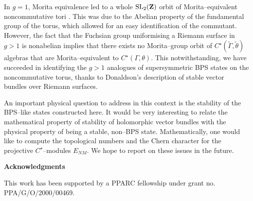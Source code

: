 \documentclass[a4paper,a4paper]{article}
\begin{document}
In $g=1$, Morita equivalence led to a whole ${\rm SL}_2({\bf Z})$ orbit of  
Morita--equivalent noncommutative tori \cite{SCHWARZ}. This was due to the 
Abelian property of the fundamental group of the torus, which allowed for 
an easy identification of the commutant. However, the fact that the Fuchsian 
group uniformising a Riemann surface in $g>1$ is nonabelian implies that 
there exists no Morita--group orbit of $C^{\star}(\tilde\Gamma, \tilde\theta)$ 
algebras that are Morita--equivalent to $C^{\star}(\Gamma,\theta)$. 
This notwithstanding, we have succeeded in identifying the $g>1$ analogues 
of supersymmetric BPS states on the noncommutative torus, 
thanks to Donaldson's description of stable vector bundles 
over Riemann surfaces.

An important physical question to address in this context is the 
stability of the BPS--like states constructed here. It would be very 
interesting to relate the mathematical property of stability of holomorphic 
vector bundles with the physical property of being a stable, non--BPS state.
Mathematically, one would like to compute the topological numbers 
and the Chern character for the projective $C^{\star}$--modules $E_{NM}$. 
We hope to report on these issues in the future.
 
{\bf Acknowledgments} 

This work has been supported by a PPARC fellowship under grant no. PPA/G/O/2000/00469.
\end{document}
